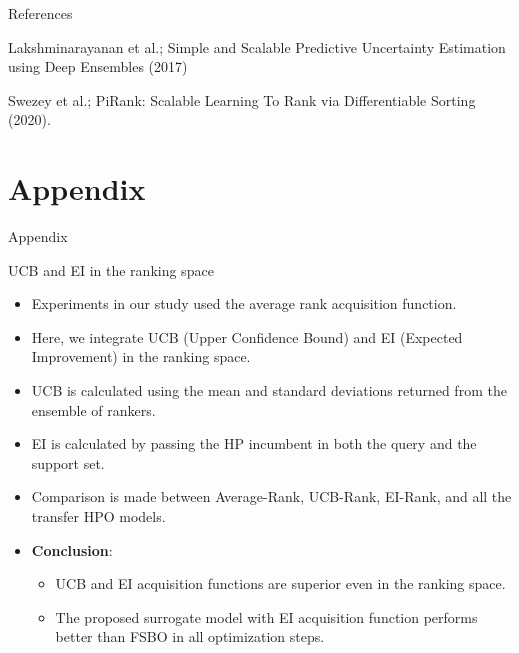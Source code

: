 \documentclass{beamer}
\begin{document}
\begin{frame}[t]{References}

\begin{thebibliography}{1}

\alert{Lakshminarayanan et al.; Simple and Scalable Predictive Uncertainty Estimation using Deep Ensembles (2017)}

\alert{Swezey et al.;  PiRank: Scalable Learning To Rank via Differentiable Sorting (2020).}

\end{thebibliography}

\end{frame}


\section{Appendix}
\begin{frame}
\centering
\LARGE{Appendix}
\end{frame}

\begin{frame}[t]{UCB and EI in the ranking space}
\begin{itemize}
\item Experiments in our study used the average rank acquisition function.
\item Here, we integrate UCB (Upper Confidence Bound) and EI (Expected Improvement) in the ranking space.
\item UCB is calculated using the mean and standard deviations returned from the ensemble of rankers.
\item EI is calculated by passing the HP incumbent in both the query and the support set.
\item Comparison is made between Average-Rank,  UCB-Rank,  EI-Rank, and all the transfer HPO models.
\item \textbf{Conclusion}:
\begin{itemize}
\item UCB and EI acquisition functions are superior even in the ranking space. \item The proposed surrogate model with EI  acquisition function performs better than FSBO in all optimization steps.
\end{itemize}
\end{itemize}
\end{frame}
\end{document}
